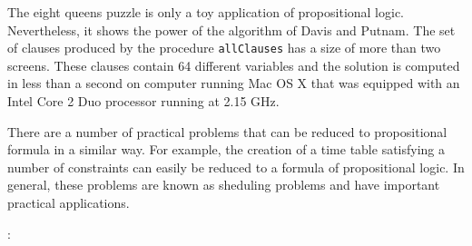 The eight queens puzzle is only a toy application of propositional logic.
Nevertheless, it shows the power of the algorithm of Davis and Putnam.
The set of clauses produced by the procedure \texttt{allClauses} has a size of more than two  screens.
These clauses contain 64 different variables and the solution is computed in less than a
second on computer running Mac OS X that was equipped with an Intel Core 2 Duo processor
running at 2.15 GHz.

There are a number of practical problems that can be reduced to propositional formula in a
similar way.  For example, the creation of a time table satisfying a number of constraints
can easily be reduced to a formula of propositional logic.  In general, these problems are
known as sheduling problems and have important practical applications.


: 
